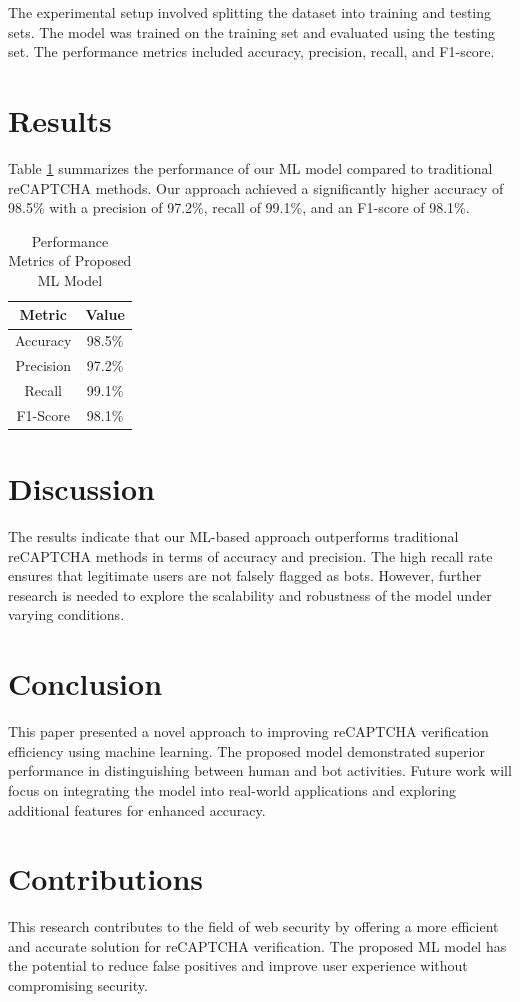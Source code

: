 \documentclass{article}
\begin{document}
The experimental setup involved splitting the dataset into training and testing sets. The model was trained on the training set and evaluated using the testing set. The performance metrics included accuracy, precision, recall, and F1-score.

\section{Results}
Table \ref{tab:results} summarizes the performance of our ML model compared to traditional reCAPTCHA methods. Our approach achieved a significantly higher accuracy of 98.5\% with a precision of 97.2\%, recall of 99.1\%, and an F1-score of 98.1\%.

\begin{table}[h]
\centering
\caption{Performance Metrics of Proposed ML Model}
\label{tab:results}
\begin{tabular}{|c|c|}
\hline
\textbf{Metric} & \textbf{Value} \\
\hline
Accuracy & 98.5\% \\
Precision & 97.2\% \\
Recall & 99.1\% \\
F1-Score & 98.1\% \\
\hline
\end{tabular}
\end{table}

\section{Discussion}
The results indicate that our ML-based approach outperforms traditional reCAPTCHA methods in terms of accuracy and precision. The high recall rate ensures that legitimate users are not falsely flagged as bots. However, further research is needed to explore the scalability and robustness of the model under varying conditions.

\section{Conclusion}
This paper presented a novel approach to improving reCAPTCHA verification efficiency using machine learning. The proposed model demonstrated superior performance in distinguishing between human and bot activities. Future work will focus on integrating the model into real-world applications and exploring additional features for enhanced accuracy.

\section{Contributions}
This research contributes to the field of web security by offering a more efficient and accurate solution for reCAPTCHA verification. The proposed ML model has the potential to reduce false positives and improve user experience without compromising security.



\end{document}
